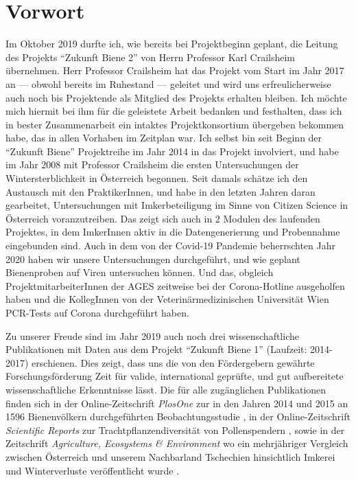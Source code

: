 {}
\section*{Vorwort}

Im Oktober 2019 durfte ich, wie bereits bei Projektbeginn geplant, die Leitung des Projekts \enquote{Zukunft Biene 2} von Herrn Professor Karl Crailsheim übernehmen. Herr Professor Crailsheim hat das Projekt vom Start im Jahr 2017 an --- obwohl bereits im Ruhestand --- geleitet und wird uns erfreulicherweise auch noch bis Projektende als Mitglied des Projekts erhalten bleiben. Ich möchte mich hiermit bei ihm für die geleistete Arbeit bedanken und festhalten, dass ich in bester Zusammenarbeit ein intaktes Projektkonsortium übergeben bekommen habe, das in allen Vorhaben im Zeitplan war. Ich selbst bin seit Beginn der \enquote{Zukunft Biene} Projektreihe im Jahr 2014 in das Projekt involviert, und habe im Jahr 2008 mit Professor Crailsheim die ersten Untersuchungen der Wintersterblichkeit in Österreich begonnen. Seit damals schätze ich den Austausch mit den PraktikerInnen, und habe in den letzten Jahren daran gearbeitet, Untersuchungen mit Imkerbeteiligung im Sinne von Citizen Science in Österreich voranzutreiben. Das zeigt sich auch in 2 Modulen des laufenden Projektes, in dem ImkerInnen aktiv in die Datengenerierung und Probennahme eingebunden sind. Auch in dem von der Covid-19 Pandemie beherrschten Jahr 2020 haben wir unsere Untersuchungen durchgeführt, und wie geplant Bienenproben auf Viren untersuchen können. Und das, obgleich ProjektmitarbeiterInnen der AGES zeitweise bei der Corona-Hotline
ausgeholfen haben und die KollegInnen von der Veterinärmedizinischen Universität Wien PCR-Tests auf Corona durchgeführt haben.

Zu unserer Freude sind im Jahr 2019 auch noch drei wissenschaftliche Publikationen mit Daten aus dem Projekt \enquote{Zukunft Biene 1} (Laufzeit: 2014-2017) erschienen. Dies zeigt, dass uns die von den Fördergebern gewährte Forschungsförderung Zeit für valide, international geprüfte, und gut aufbereitete wissenschaftliche Erkenntnisse lässt. Die für alle zugänglichen Publikationen finden sich in der Online-Zeitschrift \textit{PlosOne} zur in den Jahren 2014 und 2015 an 1596 Bienenvölkern durchgeführten
Beobachtungsstudie \citep{morawetz2019}, in der Online-Zeitschrift \textit{Scientific Reports} zur Trachtpflanzendiversität von Pollenspendern \citep{brodschneider2019a}, sowie in der Zeitschrift \textit{Agriculture, Ecosystems \& Environment} wo ein mehrjähriger Vergleich zwischen Österreich und unserem Nachbarland Tschechien hinsichtlich Imkerei und Winterverluste veröffentlicht wurde \citep{brodschneider2019}.

